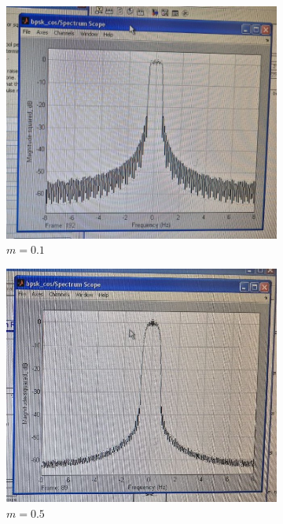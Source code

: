 \documentclass[14pt, a4paper]{article}
\begin{document}
\begin{figure}[H]
\centering
\begin{subfigure}{.33\textwidth}
  \centering
  \includegraphics[width=.95\linewidth]{../images/rt2-7a}
  \caption{$m=0.1$}
\end{subfigure}%
\begin{subfigure}{.33\textwidth}
  \centering
  \includegraphics[width=.95\linewidth]{../images/rt2-7b}
  \caption{$m=0.5$}
\end{subfigure}
\begin{subfigure}{.33\textwidth}
  \centering

\end{subfigure}
\end{figure}
\end{document}

